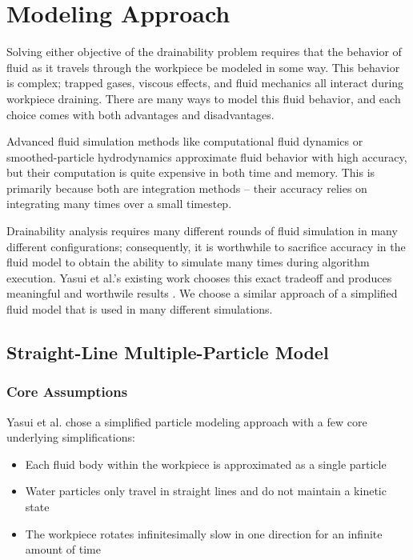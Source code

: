 						\chapter{Modeling Approach}

Solving either objective of the drainability problem requires that the behavior of fluid as it travels through the workpiece be modeled in some way. This behavior is complex; trapped gases, viscous effects, and fluid mechanics all interact during workpiece draining. There are many ways to model this fluid behavior, and each choice comes with both advantages and disadvantages.

Advanced fluid simulation methods like computational fluid dynamics or smoothed-particle hydrodynamics approximate fluid behavior with high accuracy, but their computation is quite expensive in both time and memory. This is primarily because both are integration methods -- their accuracy relies on integrating many times over a small timestep.

Drainability analysis requires many different rounds of fluid simulation in many different configurations; consequently, it is worthwhile to sacrifice accuracy in the fluid model to obtain the ability to simulate many times during algorithm execution. Yasui et al.'s existing work chooses this exact tradeoff and produces meaningful and worthwile results \cite{Yasui2011}. We choose a similar approach of a simplified fluid model that is used in many different simulations.

\section{Straight-Line Multiple-Particle Model}

	\subsection{Core Assumptions}

Yasui et al. \cite{Yasui2011} chose a simplified particle modeling approach with a few core underlying simplifications:

\begin{itemize}
	\item Each fluid body within the workpiece is approximated as a single particle
	\item Water particles only travel in straight lines and do not maintain a kinetic state
	\item The workpiece rotates infinitesimally slow in one direction for an infinite amount of time
\end{itemize}

